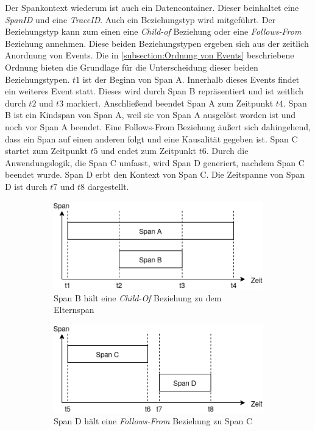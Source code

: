 Der Spankontext wiederum ist auch ein Datencontainer. Dieser beinhaltet eine \emph{SpanID} und eine \emph{TraceID}. Auch ein Beziehungstyp wird mitgeführt. Der Beziehungstyp kann zum einen eine \emph{Child-of} Beziehung oder eine \emph{Follows-From} Beziehung annehmen. Diese beiden Beziehungstypen ergeben sich aus der zeitlich Anordnung von Events. Die in \cref{subsection:Ordnung von Events} beschriebene Ordnung  bieten die Grundlage für die Unterscheidung dieser beiden Beziehungstypen. $t1$ ist der Beginn von Span A. Innerhalb dieses Events findet ein weiteres Event statt. Dieses wird durch Span B repräsentiert und ist zeitlich durch $t2$ und $t3$ markiert. Anschließend beendet Span A zum Zeitpunkt $t4$. Span B ist ein Kindspan von Span A, weil sie von Span A ausgelöst worden ist und noch vor Span A beendet. Eine Follows-From Beziehung äußert sich dahingehend, dass ein Span auf einen anderen folgt und eine Kausalität gegeben ist. Span C startet zum Zeitpunkt $t5$ und endet zum Zeitpunkt $t6$. Durch die Anwendungslogik, die Span C umfasst, wird Span D generiert, nachdem Span C beendet wurde. Span D erbt den Kontext von Span C. Die Zeitspanne von Span D ist durch $t7$ und $t8$ dargestellt.
 
\begin{figure}[]
	\centering
	\begin{subfigure}[t]{.49\linewidth}
		\centering\includegraphics[width=.8\linewidth]{img/Design/SpanBeziehungstypenA.png}
		\caption[Abbildung]{Span B hält eine \emph{Child-Of} Beziehung zu dem Elternspan}
		\label{fig:SpanBeziehungstypenA}
	\end{subfigure}
	\begin{subfigure}[t]{.49\linewidth}
		\centering\includegraphics[width=.8\linewidth]{img/Design/SpanBeziehungstypenB.png}
		\caption[Abbildung]{Span D hält eine \emph{Follows-From} Beziehung zu Span C}
		\label{fig:SpanBeziehungstypenB}
	\end{subfigure}
	\caption[Darstellung der zeitlichen Anordnung der Beziehungstypen \emph{Child-Of} und  \emph{Follows-From}]{}
\end{figure} 


